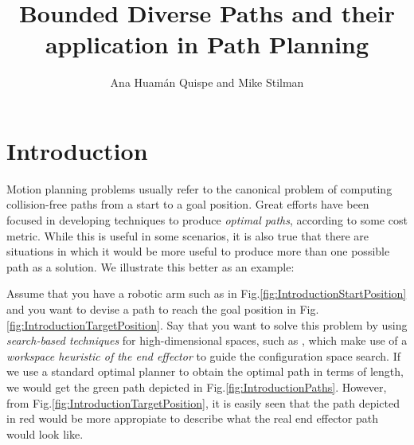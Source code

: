 \documentclass[graybox]{svmult}
\begin{document}
\title*{Bounded Diverse Paths and their application in Path Planning}
\author{Ana Huam\'an Quispe and Mike Stilman}

\maketitle



\section{Introduction}
\label{sec:Introduction}
Motion planning problems usually refer to the canonical problem of computing collision-free paths from a start to a goal position. Great efforts have been focused in developing techniques to produce \emph{optimal paths}, according to some cost metric. While this is useful in some scenarios, it is also true that there are situations in which it would be more useful to produce more than one possible path as a solution. We illustrate this better as an example:

Assume that you have a robotic arm such as in Fig.\ref{fig:IntroductionStartPosition} and you want to devise a path to reach the goal position in Fig.\ref{fig:IntroductionTargetPosition}. Say that you want to solve this problem by using \emph{search-based techniques} for high-dimensional spaces, such as \cite{Cohen2011AdaptivePrimitives}, which make use of a \emph{workspace heuristic of the end effector} to guide the configuration space search. If we use a standard optimal planner to obtain the optimal path in terms of length, we would get the green path depicted in Fig.\ref{fig:IntroductionPaths}. However, from Fig.\ref{fig:IntroductionTargetPosition}, it is easily seen that the path depicted in red would be more appropiate to describe what the real end effector path would look like. 
\end{document}
